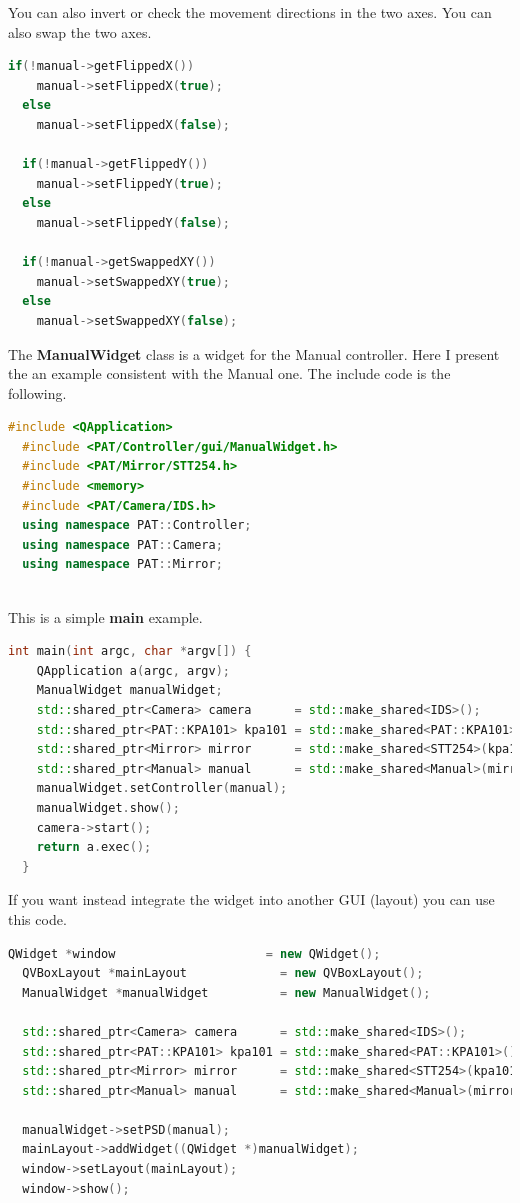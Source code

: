 You can also invert or check the movement directions in the two axes.
You can also swap the two axes.

\begin{lstlisting}[language=c++, gobble=2]
  if(!manual->getFlippedX())
    manual->setFlippedX(true);
  else
    manual->setFlippedX(false);
  
  if(!manual->getFlippedY())
    manual->setFlippedY(true);
  else
    manual->setFlippedY(false);
  
  if(!manual->getSwappedXY())
    manual->setSwappedXY(true);
  else
    manual->setSwappedXY(false);
\end{lstlisting}



The \textbf{ManualWidget} class is a widget for the Manual controller.
Here I present the an example consistent with the Manual one. The
include code is the following.

\begin{lstlisting}[language=c++, gobble=2]
  #include <QApplication>
  #include <PAT/Controller/gui/ManualWidget.h>
  #include <PAT/Mirror/STT254.h>
  #include <memory>
  #include <PAT/Camera/IDS.h>
  using namespace PAT::Controller;
  using namespace PAT::Camera;
  using namespace PAT::Mirror;
  
\end{lstlisting}


This is a simple \textbf{main} example.

\begin{lstlisting}[language=c++, gobble=2]
  int main(int argc, char *argv[]) {
    QApplication a(argc, argv);
    ManualWidget manualWidget;
    std::shared_ptr<Camera> camera      = std::make_shared<IDS>();
    std::shared_ptr<PAT::KPA101> kpa101 = std::make_shared<PAT::KPA101>();
    std::shared_ptr<Mirror> mirror      = std::make_shared<STT254>(kpa101);
    std::shared_ptr<Manual> manual      = std::make_shared<Manual>(mirror, camera->getFrame()->getCentroid());
    manualWidget.setController(manual);
    manualWidget.show();
    camera->start();
    return a.exec();
  }
\end{lstlisting}


If you want instead integrate the widget into another GUI (layout) you
can use this code.

\begin{lstlisting}[language=c++, gobble=2]
  QWidget *window                     = new QWidget();
  QVBoxLayout *mainLayout             = new QVBoxLayout();
  ManualWidget *manualWidget          = new ManualWidget();
  
  std::shared_ptr<Camera> camera      = std::make_shared<IDS>();
  std::shared_ptr<PAT::KPA101> kpa101 = std::make_shared<PAT::KPA101>();
  std::shared_ptr<Mirror> mirror      = std::make_shared<STT254>(kpa101);
  std::shared_ptr<Manual> manual      = std::make_shared<Manual>(mirror, camera->getFrame()->getCentroid());
  
  manualWidget->setPSD(manual);
  mainLayout->addWidget((QWidget *)manualWidget);
  window->setLayout(mainLayout);
  window->show();
\end{lstlisting}



